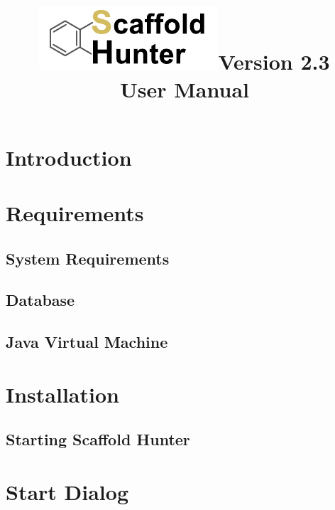 \documentclass[a4paper,10pt,english,twoside,bibliography=totoc,listof=totoc]{scrbook}
\title{\includegraphics*[scale=2]{images/sh_logo}{\small Version 2.3}\\\vspace{5mm}User Manual}
\newcommand{\sh}{Scaffold Hunter\xspace} %
\begin{document}

\maketitle
\setcounter{page}{0}\clearpage %
\tableofcontents


\chapter{Introduction}
  

\chapter{Requirements} \label{sec:scaffoldhunter:requirements}
	\section{System Requirements}
		
	\section{Database}
		
	\section{Java Virtual Machine} \label{sec:scaffoldhunter:requirements:jvm}
		


\chapter{Installation}
	

	\section{Starting \sh}
		


\chapter{Start Dialog}
	
\end{document}
